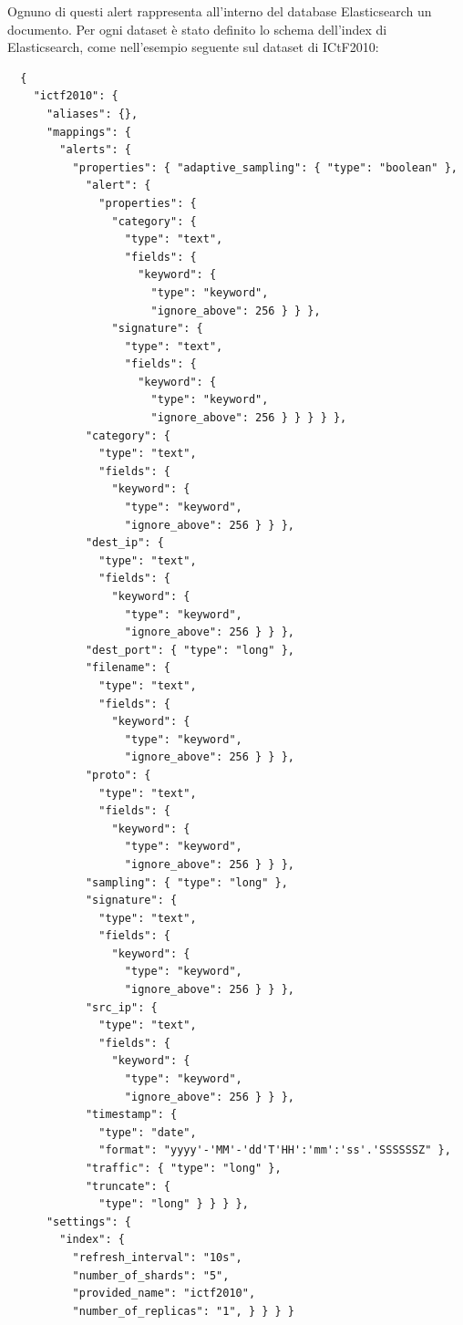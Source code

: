 \documentclass[12pt,a4paper,openright,twoside]{report}
\begin{document}
Ognuno di questi alert rappresenta all'interno del database Elasticsearch un
documento.
Per ogni dataset \`e stato definito lo schema dell'index di Elasticsearch, come
nell'esempio seguente sul dataset di ICtF2010:
\begin{verbatim}
  {
    "ictf2010": {
      "aliases": {},
      "mappings": {
        "alerts": {
          "properties": { "adaptive_sampling": { "type": "boolean" },
            "alert": {
              "properties": {
                "category": {
                  "type": "text",
                  "fields": {
                    "keyword": {
                      "type": "keyword",
                      "ignore_above": 256 } } },
                "signature": {
                  "type": "text",
                  "fields": {
                    "keyword": {
                      "type": "keyword",
                      "ignore_above": 256 } } } } },
            "category": {
              "type": "text",
              "fields": {
                "keyword": {
                  "type": "keyword",
                  "ignore_above": 256 } } },
            "dest_ip": {
              "type": "text",
              "fields": {
                "keyword": {
                  "type": "keyword",
                  "ignore_above": 256 } } },
            "dest_port": { "type": "long" },
            "filename": {
              "type": "text",
              "fields": {
                "keyword": {
                  "type": "keyword",
                  "ignore_above": 256 } } },
            "proto": {
              "type": "text",
              "fields": {
                "keyword": {
                  "type": "keyword",
                  "ignore_above": 256 } } },
            "sampling": { "type": "long" },
            "signature": {
              "type": "text",
              "fields": {
                "keyword": {
                  "type": "keyword",
                  "ignore_above": 256 } } },
            "src_ip": {
              "type": "text",
              "fields": {
                "keyword": {
                  "type": "keyword",
                  "ignore_above": 256 } } },
            "timestamp": {
              "type": "date",
              "format": "yyyy'-'MM'-'dd'T'HH':'mm':'ss'.'SSSSSSZ" },
            "traffic": { "type": "long" },
            "truncate": {
              "type": "long" } } } },
      "settings": {
        "index": {
          "refresh_interval": "10s",
          "number_of_shards": "5",
          "provided_name": "ictf2010",
          "number_of_replicas": "1", } } } }
\end{verbatim}
\end{document}
